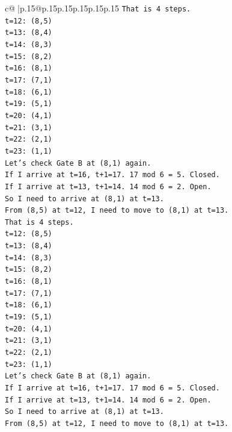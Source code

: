 \documentclass{article}
\begin{document}
{\begin{supertabular}{c@{$\;$}|p{.15\linewidth}@{}p{.15\linewidth}p{.15\linewidth}p{.15\linewidth}p{.15\linewidth}p{.15\linewidth}}
{{{\texttt{That is 4 steps.} \\
\texttt{t=12: (8,5)} \\
\texttt{t=13: (8,4)} \\
\texttt{t=14: (8,3)} \\
\texttt{t=15: (8,2)} \\
\texttt{t=16: (8,1)} \\
\texttt{t=17: (7,1)} \\
\texttt{t=18: (6,1)} \\
\texttt{t=19: (5,1)} \\
\texttt{t=20: (4,1)} \\
\texttt{t=21: (3,1)} \\
\texttt{t=22: (2,1)} \\
\texttt{t=23: (1,1)} \\
\texttt{Let's check Gate B at (8,1) again.} \\
\texttt{If I arrive at t=16, t+1=17. 17 mod 6 = 5. Closed.} \\
\texttt{If I arrive at t=13, t+1=14. 14 mod 6 = 2. Open.} \\
\texttt{So I need to arrive at (8,1) at t=13.} \\
\texttt{From (8,5) at t=12, I need to move to (8,1) at t=13.} \\
\texttt{That is 4 steps.} \\
\texttt{t=12: (8,5)} \\
\texttt{t=13: (8,4)} \\
\texttt{t=14: (8,3)} \\
\texttt{t=15: (8,2)} \\
\texttt{t=16: (8,1)} \\
\texttt{t=17: (7,1)} \\
\texttt{t=18: (6,1)} \\
\texttt{t=19: (5,1)} \\
\texttt{t=20: (4,1)} \\
\texttt{t=21: (3,1)} \\
\texttt{t=22: (2,1)} \\
\texttt{t=23: (1,1)} \\
\texttt{Let's check Gate B at (8,1) again.} \\
\texttt{If I arrive at t=16, t+1=17. 17 mod 6 = 5. Closed.} \\
\texttt{If I arrive at t=13, t+1=14. 14 mod 6 = 2. Open.} \\
\texttt{So I need to arrive at (8,1) at t=13.} \\
\texttt{From (8,5) at t=12, I need to move to (8,1) at t=13.} \\
}}}
\end{supertabular}}
\end{document}
